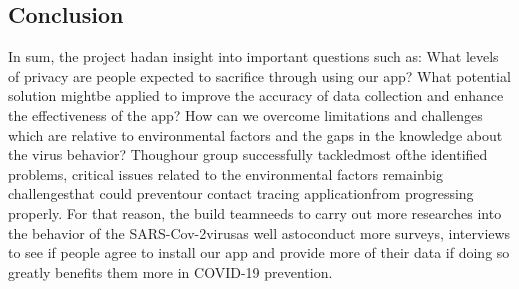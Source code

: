   \subsection{Conclusion}
    \par In sum, the project hadan insight into important questions such as: What levels of privacy are people expected to sacrifice through using our app? What potential solution mightbe applied to improve the accuracy of data collection and enhance the effectiveness of  the  app?  How  can  we  overcome  limitations  and  challenges  which  are  relative  to environmental factors and the gaps in the knowledge about the virus behavior? Thoughour group successfully tackledmost  ofthe identified problems,  critical  issues  related  to the environmental  factors  remainbig  challengesthat  could preventour  contact tracing applicationfrom progressing properly. For that reason, the build teamneeds to carry out more  researches  into the  behavior  of  the SARS-Cov-2virusas  well  astoconduct  more surveys, interviews to see if people agree to install our app and provide more of their data if doing so greatly benefits them more in COVID-19 prevention.


